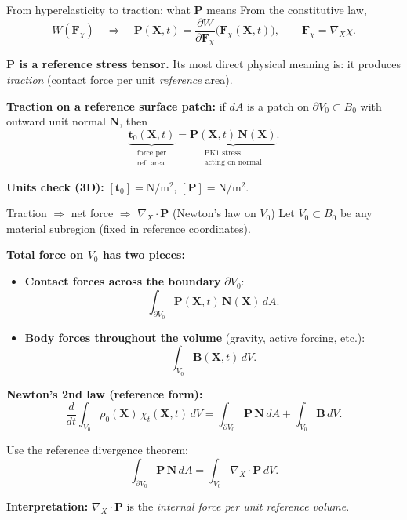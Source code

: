 \documentclass[aspectratio=169]{beamer}
\newcommand{\X}{\bm{X}}
\newcommand{\divX}{\nabla_{\!X}\!\cdot}
\newcommand{\Pten}{\bm{P}}        %
\newcommand{\Fdef}{\bm{F}_{\chi}} %
\newcommand{\Nvec}{\bm{N}}       %
\newcommand{\tvec}{\bm{t}}       %
\begin{document}
\begin{frame}{From hyperelasticity to traction: what \(\Pten\) means}
\small
From the constitutive law,
\[
W(\Fdef)\quad\Rightarrow\quad \Pten(\X,t)=\frac{\partial W}{\partial \Fdef}\Big(\Fdef(\X,t)\Big),
\qquad \Fdef=\nabla_{\!X}\chi.
\]

\medskip
\textbf{\(\Pten\) is a reference stress tensor.} Its most direct physical meaning is:
it produces \emph{traction} (contact force per unit \emph{reference} area).

\medskip
\textbf{Traction on a reference surface patch:}  
if \(dA\) is a patch on \(\partial V_0\subset B_0\) with outward unit normal \(\Nvec\), then
\[
\underbrace{\tvec_0(\X,t)}_{\substack{\text{force per}\\\text{ref.\ area}}}
=
\underbrace{\Pten(\X,t)\,\Nvec(\X)}_{\substack{\text{PK1 stress}\\\text{acting on normal}}}.
\]

\medskip
\textbf{Units check (3D):} \([\tvec_0]=\text{N}/\text{m}^2\), \([\Pten]=\text{N}/\text{m}^2\).


\end{frame}

\begin{frame}{Traction \(\Rightarrow\) net force \(\Rightarrow\) \(\divX\Pten\) (Newton's law on \(V_0\))}
\footnotesize
Let \(V_0\subset B_0\) be any material subregion (fixed in reference coordinates).

\medskip
\textbf{Total force on \(V_0\) has two pieces:}
\begin{itemize}
\item \textbf{Contact forces across the boundary} \(\partial V_0\):
\[
\int_{\partial V_0}\Pten(\X,t)\,\Nvec(\X)\,dA.
\]
\item \textbf{Body forces throughout the volume} (gravity, active forcing, etc.):
\[
\int_{V_0}\bm{B}(\X,t)\,dV.
\]
\end{itemize}

\medskip
\textbf{Newton's 2nd law (reference form):}
\[
\frac{d}{dt}\int_{V_0}\rho_0(\X)\,\chi_t(\X,t)\,dV
=
\int_{\partial V_0}\Pten\,\Nvec\,dA+\int_{V_0}\bm{B}\,dV.
\]

\medskip
Use the reference divergence theorem:
\[
\int_{\partial V_0}\Pten\,\Nvec\,dA=\int_{V_0}\divX\Pten\,dV.
\]

\medskip
\textbf{Interpretation:} \(\divX\Pten\) is the \emph{internal force per unit reference volume}.

\end{frame}
\end{document}
